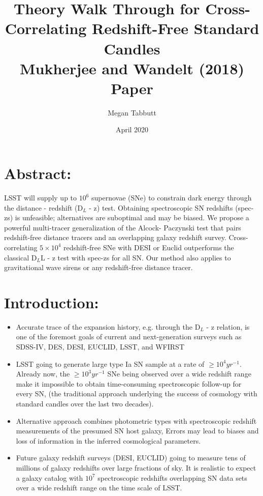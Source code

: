 \documentclass{article}
\title{ {\bf Theory Walk Through for Cross-Correlating Redshift-Free Standard Candles} \\
\vspace{10pt}
\LARGE Mukherjee and Wandelt (2018) Paper}
\date{April 2020}
\author{Megan Tabbutt}
\begin{document}
\doublespacing
\maketitle



\fontsize{11}{12}


\section{Abstract:}

LSST will supply up to $10^6$ supernovae (SNe) to constrain dark energy through the distance - redshift (D$_L$ - z) test. Obtaining spectroscopic SN redshifts (spec-zs) is unfeasible; alternatives are suboptimal and may be biased. We propose a powerful multi-tracer generalization of the Alcock- Paczynski test that pairs redshift-free distance tracers and an overlapping galaxy redshift survey. Cross-correlating $5\times 10^4$ redshift-free SNe with DESI or Euclid outperforms the classical D$_L$L - z test with spec-zs for all SN. Our method also applies to gravitational wave sirens or any redshift-free distance tracer.



\section{Introduction:}

\begin{itemize}

  \item Accurate trace of the expansion history, e.g. through the D$_L$ - z relation, is one of the foremost goals of current and next-generation surveys such as SDSS-IV, DES, DESI, EUCLID, LSST, and WFIRST
  
  \item LSST going to generate large type Ia SN sample at a rate of $\ge 10^4 yr^{-1}$. Already now, the $\ge 10^3 yr^{-1}$ SNe being observed over a wide redshift range make it impossible to obtain time-consuming spectroscopic follow-up for every SN, (the traditional approach underlying the success of cosmology with standard candles over the last two decades). 
  
  \item Alternative approach combines photometric types with spectroscopic redshift measurements of the presumed SN host galaxy,  Errors may lead to biases and loss of information in the inferred cosmological parameters.
  
  \item Future galaxy redshift surveys (DESI, EUCLID)  going to measure tens of millions of galaxy redshifts over large fractions of sky. It is realistic to expect a galaxy catalog with $10^7$ spectroscopic redshifts overlapping SN data sets over a wide redshift range on the time scale of LSST.
  
\end{itemize}
\end{document}
